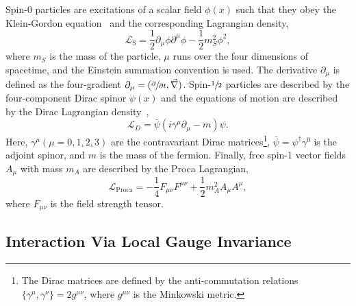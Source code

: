 Spin-0 particles are excitations of a scalar field $\phi(x)$ such that they obey the Klein-Gordon equation~\cite{Klein1926} and the corresponding Lagrangian density,
\begin{equation}
    \label{eq:scalar_lagrangian}
    \mathcal{L}_\text{S} = \frac{1}{2} \partial_\mu \phi \partial^\mu \phi - \frac{1}{2} m_S^2 \phi^2,
\end{equation}
where $m_S$ is the mass of the particle, $\mu$ runs over the four dimensions of spacetime, and the Einstein summation convention is used.
The derivative $\partial_\mu$ is defined as the four-gradient $\partial_\mu = (\sfrac{\partial}{\partial t}, \vec{\nabla})$.
Spin-$\sfrac{1}{2}$ particles are described by the four-component Dirac spinor $\psi(x)$ and the equations of motion are described by the Dirac Lagrangian density~\cite{Dirac1928},
\begin{equation}
    \label{eq:dirac_lagrangian}
    \mathcal{L}_D = \bar{\psi} (i \gamma^\mu \partial_\mu - m) \psi.
\end{equation}
Here, $\gamma^\mu(\mu=0,1,2,3)$ are the contravariant Dirac matrices\footnote{The Dirac matrices are defined by the anti-commutation relations$\{ \gamma^\mu, \gamma^\nu \} = 2 g^{\mu\nu}$, where $g^{\mu\nu}$ is the Minkowski metric.}, $\bar{\psi} = \psi^\dagger \gamma^0$ is the adjoint spinor, and $m$ is the mass of the fermion.
Finally, free spin-1 vector fields $A_\mu$ with mass $m_A$ are described by the Proca Lagrangian,
\begin{equation}
    \label{eq:proca_lagrangian}
    \mathcal{L}_\text{Proca} = -\frac{1}{4} F_{\mu\nu} F^{\mu\nu} + \frac{1}{2} m_A^2 A_\mu A^{\mu},
\end{equation}
where $F_{\mu\nu}$ is the field strength tensor.

\subsection{Interaction Via Local Gauge Invariance}
\label{sec:local_gauge_invariance}

